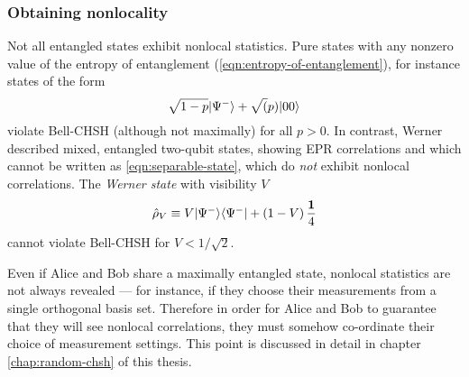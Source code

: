 \subsubsection{Obtaining nonlocality}
Not all entangled states exhibit nonlocal statistics. Pure states with any nonzero value of the entropy of entanglement (\ref{eqn:entropy-of-entanglement}), for instance states of the form
\begin{equation}
     \sqrt{1-p} \mbox{$ | \Psi^- \rangle $} + \sqrt(p) \mbox{$ | 00 \rangle $} 
\end{equation}
violate Bell-CHSH (although not maximally) for all $p>0$. In contrast, Werner \cite{Werner1989} described mixed, entangled two-qubit states, showing EPR correlations and which cannot be written as \ref{eqn:separable-state}, which do \emph{not} exhibit nonlocal correlations. The \emph{Werner state} with visibility $V$
\begin{equation}
    \hat{\rho}_V \equiv V\mbox{$ | \Psi^- \rangle $} \mbox{$ \langle \Psi^- | $} + \left(1-V\right) \frac{\mathbf{1}}{4}
    \label{eqn:werner-state}
\end{equation}
cannot violate Bell-CHSH for $V<1/\sqrt{2}$. 

Even if Alice and Bob share a maximally entangled state, nonlocal statistics are not always revealed --- for instance, if they choose their measurements from a single orthogonal basis set. 
Therefore in order for Alice and Bob to guarantee that they will see nonlocal correlations, they must somehow co-ordinate their choice of measurement settings. This point is discussed in detail in chapter \ref{chap:random-chsh} of this thesis.



